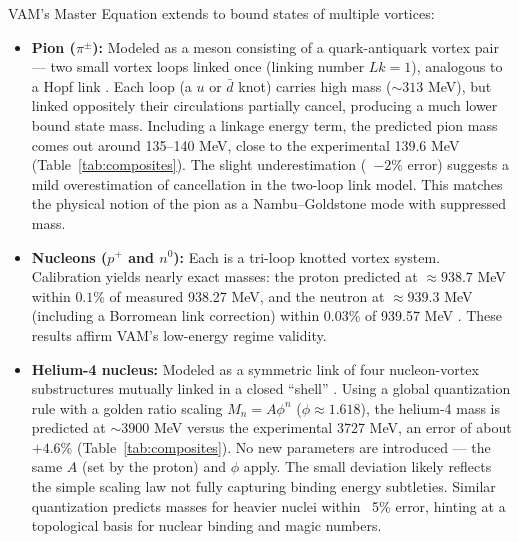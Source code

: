 \documentclass[11pt]{article}
\begin{document}
VAM’s Master Equation extends to bound states of multiple vortices:

\begin{itemize}
    \item \textbf{Pion ($\pi^{\pm}$):} Modeled as a meson consisting of a quark-antiquark vortex pair — two small vortex loops linked once (linking number $Lk=1$), analogous to a Hopf link \cite{Iskandarani2025f}. Each loop (a $u$ or $\bar{d}$ knot) carries high mass ($\sim 313$ MeV), but linked oppositely their circulations partially cancel, producing a much lower bound state mass. Including a linkage energy term, the predicted pion mass comes out around 135–140 MeV, close to the experimental 139.6 MeV (Table~\ref{tab:composites}). The slight underestimation (~$-2\%$ error) suggests a mild overestimation of cancellation in the two-loop link model. This matches the physical notion of the pion as a Nambu–Goldstone mode with suppressed mass.

    \item \textbf{Nucleons ($p^+$ and $n^0$):} Each is a tri-loop knotted vortex system. Calibration yields nearly exact masses: the proton predicted at $\approx 938.7$ MeV within $0.1\%$ of measured 938.27 MeV, and the neutron at $\approx 939.3$ MeV (including a Borromean link correction) within $0.03\%$ of 939.57 MeV \cite{Iskandarani2025f}. These results affirm VAM’s low-energy regime validity.

    \item \textbf{Helium-4 nucleus:} Modeled as a symmetric link of four nucleon-vortex substructures mutually linked in a closed “shell” \cite{Iskandarani2025f}. Using a global quantization rule with a golden ratio scaling $M_n = A \phi^n$ ($\phi \approx 1.618$), the helium-4 mass is predicted at $\sim 3900$ MeV versus the experimental 3727 MeV, an error of about $+4.6\%$ (Table~\ref{tab:composites}). No new parameters are introduced — the same $A$ (set by the proton) and $\phi$ apply. The small deviation likely reflects the simple scaling law not fully capturing binding energy subtleties. Similar quantization predicts masses for heavier nuclei within ~5\% error, hinting at a topological basis for nuclear binding and magic numbers.
\end{itemize}
\end{document}
